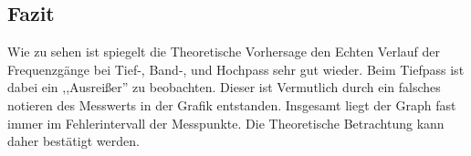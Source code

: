 \begin{center}
\begin{minipage}{\linewidth}
\end{minipage}
\end{center}
\subsection{Fazit}
Wie zu sehen ist spiegelt die Theoretische Vorhersage den Echten Verlauf der Frequenzgänge bei Tief-, Band-, und Hochpass sehr gut wieder. Beim Tiefpass ist dabei ein ,,Ausreißer'' zu beobachten. Dieser ist Vermutlich durch ein falsches notieren des Messwerts in der Grafik entstanden. Insgesamt liegt der Graph fast immer im Fehlerintervall der Messpunkte. Die Theoretische Betrachtung kann daher bestätigt werden.